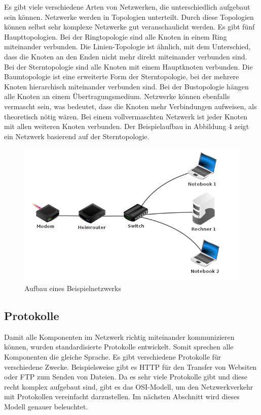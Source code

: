 \documentclass[12pt]{article}
\begin{document}
Es gibt viele verschiedene Arten von Netzwerken, die unterschiedlich aufgebaut  sein können. Netzwerke werden in Topologien unterteilt. Durch diese Topologien können selbst sehr komplexe Netzwerke gut veranschaulicht werden. Es gibt fünf Haupttopologien. Bei der Ringtopologie sind alle Knoten in einem Ring miteinander verbunden. Die Linien-Topologie ist ähnlich, mit dem Unterschied, dass die Knoten an den Enden nicht mehr direkt miteinander verbunden sind. Bei der Sterntopologie sind alle Knoten mit einem Hauptknoten verbunden. Die Baumtopologie ist eine erweiterte Form der Sterntopologie, bei der mehrere Knoten hierarchisch miteinander verbunden sind. Bei der Bustopologie hängen alle Knoten an einem Übertragungsmedium. Netzwerke können ebenfalls vermascht sein, was bedeutet, dass die Knoten mehr Verbindungen aufweisen, als theoretisch nötig wären. Bei einem vollvermaschten Netzwerk ist jeder Knoten mit allen weiteren Knoten verbunden.\cite{topologien-kurthelec} Der Beispielaufbau in Abbildung 4 zeigt ein Netzwerk basierend auf der Sterntopologie.

\begin{figure}[h]
	\centering
	\includegraphics[scale=0.7]{Bilder/beispielnetzwerk}
	\caption{Aufbau eines Beispielnetzwerks \cite{network-self}}
	\label{fig:figure4}
\end{figure}






\subsection{Protokolle}

Damit alle Komponenten im Netzwerk richtig miteinander kommunizieren können, wurden standardisierte Protokolle entwickelt. Somit  sprechen alle Komponenten \glq die gleiche Sprache\grq. Es gibt verschiedene Protokolle für verschiedene Zwecke. Beispielsweise gibt es HTTP für den Transfer von Websiten oder FTP zum Senden von Dateien. Da es sehr viele Protokolle gibt und diese recht komplex aufgebaut sind, gibt es das OSI-Modell, um den Netzwerkverkehr mit Protokollen vereinfacht darzustellen. Im nächsten Abschnitt wird dieses Modell genauer beleuchtet.
\end{document}
